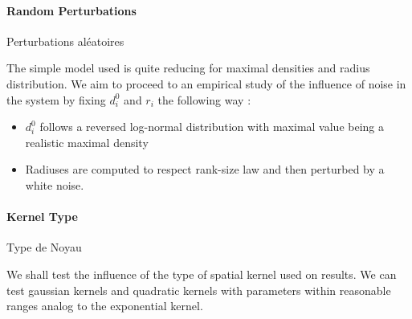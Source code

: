 %



\paragraph{Random Perturbations}{Perturbations aléatoires}

The simple model used is quite reducing for maximal densities and radius distribution. We aim to proceed to an empirical study of the influence of noise in the system by fixing $d_i^0$ and $r_i$ the following way :
\begin{itemize}
\item $d_i^0$ follows a reversed log-normal distribution with maximal value being a realistic maximal density
\item Radiuses are computed to respect rank-size law and then perturbed by a white noise.
\end{itemize}







\paragraph{Kernel Type}{Type de Noyau}

We shall test the influence of the type of spatial kernel used on results. We can test gaussian kernels and quadratic kernels with parameters within reasonable ranges analog to the exponential kernel. %


%



